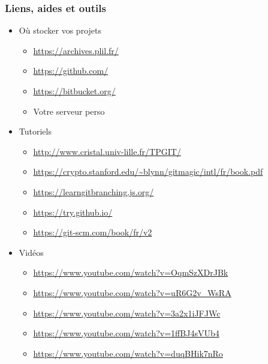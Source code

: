 \documentclass[table,tikz,12pt,svgnames]{beamer}
\begin{document}
\begin{frame}
\frametitle{Liens, aides et outils}
\begin{itemize}
	\item Où stocker vos projets
	\begin{itemize}
		\item \url{https://archives.plil.fr/}
		\item \url{https://github.com/}
		\item \url{https://bitbucket.org/}
		\item Votre serveur perso
	\end{itemize}
	\item Tutoriels
	\begin{itemize}
		\item \url{http://www.cristal.univ-lille.fr/TPGIT/}
		\item \url{https://crypto.stanford.edu/~blynn/gitmagic/intl/fr/book.pdf}
		\item \url{https://learngitbranching.js.org/}
		\item \url{https://try.github.io/}
		\item \url{https://git-scm.com/book/fr/v2}
	\end{itemize}
	\item Vidéos
	\begin{itemize}
		\item \url{https://www.youtube.com/watch?v=OqmSzXDrJBk}
		\item \url{https://www.youtube.com/watch?v=uR6G2v_WsRA}
		\item \url{https://www.youtube.com/watch?v=3a2x1iJFJWc}
		\item \url{https://www.youtube.com/watch?v=1ffBJ4sVUb4}
		\item \url{https://www.youtube.com/watch?v=duqBHik7nRo}
	\end{itemize}
\end{itemize}
\end{frame}


\end{document}

